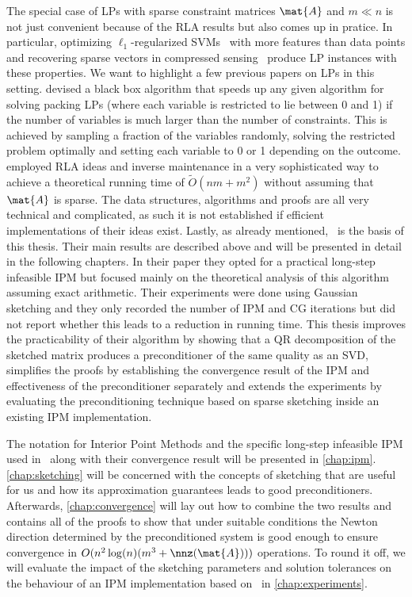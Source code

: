 The special case of LPs with sparse constraint matrices \(\mat{A}\) and \(m \ll n\) is not just convenient because of the RLA results but also comes up in pratice.
In particular, optimizing \(\ell_1\)-regularized SVMs~\cite{ZhuRossetTibshiraniHastie-1normSupportVectorMachines} with more features than data points and recovering sparse vectors in compressed sensing~\cite{YangZhang-l1ProblemsInCompressiveSensing} produce LP instances with these properties.
We want to highlight a few previous papers on LPs in this setting. \textcite{LondonVardiWiermanYi-PackingLinearPrograms} devised a black box algorithm that speeds up any given algorithm for solving packing LPs (where each variable is restricted to lie between 0 and 1) if the number of variables is much larger than the number of constraints.
This is achieved by sampling a fraction of the variables randomly, solving the restricted problem optimally and setting each variable to 0 or 1 depending on the outcome.
\textcite{Sidford-TallDenseLinearPrograms} employed RLA ideas and inverse maintenance in a very sophisticated way to achieve a theoretical running time of \(\tilde{O}(nm + m^2)\) without assuming that \(\mat{A}\) is sparse.
The data structures, algorithms and proofs are all very technical and complicated, as such it is not established if efficient implementations of their ideas exist.
Lastly, as already mentioned,~\cite{Avron-FasterRandomizedInfeasibleIPMs} is the basis of this thesis.
Their main results are described above and will be presented in detail in the following chapters.
In their paper they opted for a practical long-step infeasible IPM but focused mainly on the theoretical analysis of this algorithm assuming exact arithmetic.
Their experiments were done using Gaussian sketching and they only recorded the number of IPM and CG iterations but did not report whether this leads to a reduction in running time.
This thesis improves the practicability of their algorithm by showing that a QR decomposition of the sketched matrix produces a preconditioner of the same quality as an SVD, simplifies the proofs by establishing the convergence result of the IPM and effectiveness of the preconditioner separately and extends the experiments by evaluating the preconditioning technique based on sparse sketching inside an existing IPM implementation.

The notation for Interior Point Methods and the specific long-step infeasible IPM used in~\cite{Monteiro-ConvergenceAnalysisLongStepInfeasibleIPMs} along with their convergence result will be presented in \cref{chap:ipm}.
\cref{chap:sketching} will be concerned with the concepts of sketching that are useful for us and how its approximation guarantees leads to good preconditioners.
Afterwards, \cref{chap:convergence} will lay out how to combine the two results and contains all of the proofs to show that under suitable conditions the Newton direction determined by the preconditioned system is good enough to ensure convergence in \(O(n^2 \log(n) (m^3 + \nnz(\mat{A})))\) operations.
To round it off, we will evaluate the impact of the sketching parameters and solution tolerances on the behaviour of an IPM implementation based on~\cite{AndersenAndersen-MosekInteriorPointMethod} in \cref{chap:experiments}.
